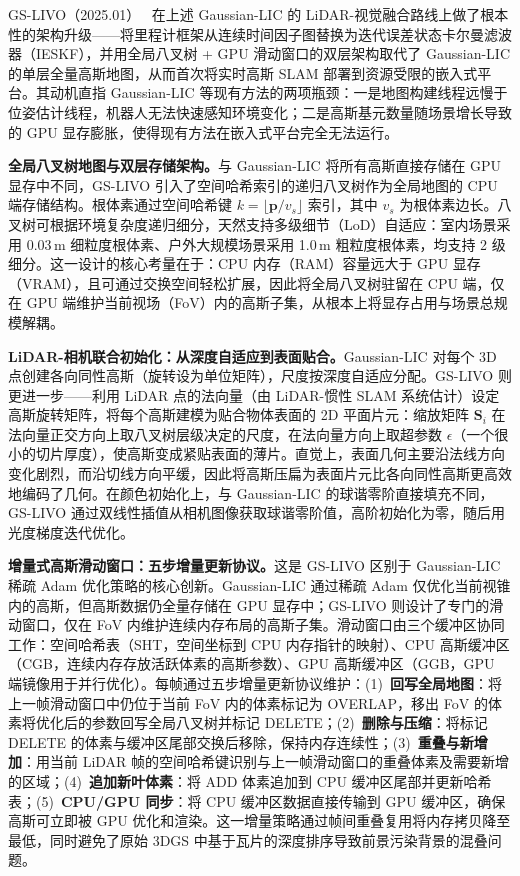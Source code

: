GS-LIVO（2025.01）~\cite{2501_08672} 在上述 Gaussian-LIC 的 LiDAR-视觉融合路线上做了根本性的架构升级——将里程计框架从连续时间因子图替换为迭代误差状态卡尔曼滤波器（IESKF），并用全局八叉树 + GPU 滑动窗口的双层架构取代了 Gaussian-LIC 的单层全量高斯地图，从而首次将实时高斯 SLAM 部署到资源受限的嵌入式平台。其动机直指 Gaussian-LIC 等现有方法的两项瓶颈：一是地图构建线程远慢于位姿估计线程，机器人无法快速感知环境变化；二是高斯基元数量随场景增长导致的 GPU 显存膨胀，使得现有方法在嵌入式平台完全无法运行。

\textbf{全局八叉树地图与双层存储架构。}与 Gaussian-LIC 将所有高斯直接存储在 GPU 显存中不同，GS-LIVO 引入了空间哈希索引的递归八叉树作为全局地图的 CPU 端存储结构。根体素通过空间哈希键 $k = \lfloor \mathbf{p} / v_s \rfloor$ 索引，其中 $v_s$ 为根体素边长。八叉树可根据环境复杂度递归细分，天然支持多级细节（LoD）自适应：室内场景采用 0.03\,m 细粒度根体素、户外大规模场景采用 1.0\,m 粗粒度根体素，均支持 2 级细分。这一设计的核心考量在于：CPU 内存（RAM）容量远大于 GPU 显存（VRAM），且可通过交换空间轻松扩展，因此将全局八叉树驻留在 CPU 端，仅在 GPU 端维护当前视场（FoV）内的高斯子集，从根本上将显存占用与场景总规模解耦。

\textbf{LiDAR-相机联合初始化：从深度自适应到表面贴合。}Gaussian-LIC 对每个 3D 点创建各向同性高斯（旋转设为单位矩阵），尺度按深度自适应分配。GS-LIVO 则更进一步——利用 LiDAR 点的法向量（由 LiDAR-惯性 SLAM 系统估计）设定高斯旋转矩阵，将每个高斯建模为贴合物体表面的 2D 平面片元：缩放矩阵 $\mathbf{S}_i$ 在法向量正交方向上取八叉树层级决定的尺度，在法向量方向上取超参数 $\epsilon$（一个很小的切片厚度），使高斯变成紧贴表面的薄片。直觉上，表面几何主要沿法线方向变化剧烈，而沿切线方向平缓，因此将高斯压扁为表面片元比各向同性高斯更高效地编码了几何。在颜色初始化上，与 Gaussian-LIC 的球谐零阶直接填充不同，GS-LIVO 通过双线性插值从相机图像获取球谐零阶值，高阶初始化为零，随后用光度梯度迭代优化。

\textbf{增量式高斯滑动窗口：五步增量更新协议。}这是 GS-LIVO 区别于 Gaussian-LIC 稀疏 Adam 优化策略的核心创新。Gaussian-LIC 通过稀疏 Adam 仅优化当前视锥内的高斯，但高斯数据仍全量存储在 GPU 显存中；GS-LIVO 则设计了专门的滑动窗口，仅在 FoV 内维护连续内存布局的高斯子集。滑动窗口由三个缓冲区协同工作：空间哈希表（SHT，空间坐标到 CPU 内存指针的映射）、CPU 高斯缓冲区（CGB，连续内存存放活跃体素的高斯参数）、GPU 高斯缓冲区（GGB，GPU 端镜像用于并行优化）。每帧通过五步增量更新协议维护：(1)~\textbf{回写全局地图}：将上一帧滑动窗口中仍位于当前 FoV 内的体素标记为 OVERLAP，移出 FoV 的体素将优化后的参数回写全局八叉树并标记 DELETE；(2)~\textbf{删除与压缩}：将标记 DELETE 的体素与缓冲区尾部交换后移除，保持内存连续性；(3)~\textbf{重叠与新增加}：用当前 LiDAR 帧的空间哈希键识别与上一帧滑动窗口的重叠体素及需要新增的区域；(4)~\textbf{追加新叶体素}：将 ADD 体素追加到 CPU 缓冲区尾部并更新哈希表；(5)~\textbf{CPU/GPU 同步}：将 CPU 缓冲区数据直接传输到 GPU 缓冲区，确保高斯可立即被 GPU 优化和渲染。这一增量策略通过帧间重叠复用将内存拷贝降至最低，同时避免了原始 3DGS 中基于瓦片的深度排序导致前景污染背景的混叠问题。

